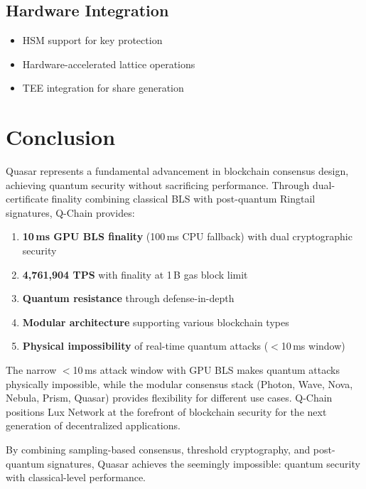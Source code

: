 \documentclass[11pt]{article}
\begin{document}
\subsection{Hardware Integration}
\begin{itemize}
\item HSM support for key protection
\item Hardware-accelerated lattice operations
\item TEE integration for share generation
\end{itemize}

\section{Conclusion}

Quasar represents a fundamental advancement in blockchain consensus design, achieving quantum security without sacrificing performance. Through dual-certificate finality combining classical BLS with post-quantum Ringtail signatures, Q-Chain provides:

\begin{enumerate}
\item \textbf{10\,ms GPU BLS finality} (100\,ms CPU fallback) with dual cryptographic security
\item \textbf{4{,}761{,}904 TPS} with finality at 1\,B gas block limit
\item \textbf{Quantum resistance} through defense-in-depth
\item \textbf{Modular architecture} supporting various blockchain types
\item \textbf{Physical impossibility} of real-time quantum attacks ($<$10\,ms window)
\end{enumerate}

The narrow $<$10\,ms attack window with GPU BLS makes quantum attacks physically impossible, while the modular consensus stack (Photon, Wave, Nova, Nebula, Prism, Quasar) provides flexibility for different use cases. Q-Chain positions Lux Network at the forefront of blockchain security for the next generation of decentralized applications.

By combining sampling-based consensus, threshold cryptography, and post-quantum signatures, Quasar achieves the seemingly impossible: quantum security with classical-level performance.
\end{document}
